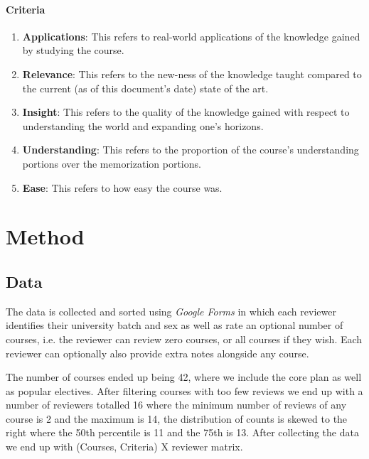 \documentclass[12pt,a4paper]{article}
\begin{document}
\paragraph{Criteria}
\begin{enumerate}
    \item \textbf{Applications}: This refers to real-world applications of the knowledge gained by studying the course.
    \item \textbf{Relevance}: This refers to the new-ness of the knowledge taught compared to the current (as of this document's date) state of the art.
    \item \textbf{Insight}: This refers to the quality of the knowledge gained with respect to understanding the world and expanding one's horizons.
    \item \textbf{Understanding}: This refers to the proportion of the course's understanding portions over the memorization portions. 
    \item \textbf{Ease}: This refers to how easy the course was.
\end{enumerate}

\section{Method}
\subsection{Data}
The data is collected and sorted using \emph{Google Forms} in which each reviewer identifies their university batch and sex as well as rate an optional number of courses, i.e. the reviewer can review zero courses, or all courses if they wish. Each reviewer can optionally also provide extra notes alongside any course. 

The number of courses ended up being 42, where we include the core plan as well as popular electives. After filtering courses with too few reviews we end up with a number of reviewers totalled 16 where the minimum number of reviews of any course is 2 and the maximum is 14, the distribution of counts is skewed to the right where the 50th percentile is 11 and the 75th is 13. After collecting the data we end up with (Courses, Criteria) X reviewer matrix.
\end{document}
